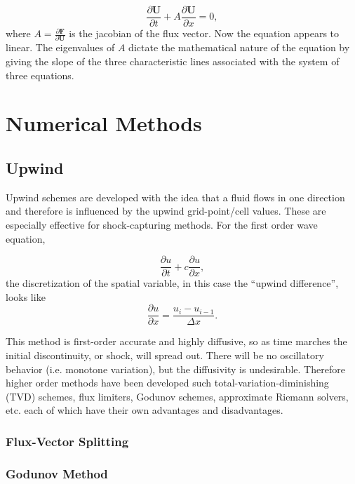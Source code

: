 \documentclass[]{article}
\begin{document}
    \begin{equation}
    	\frac{\partial \textbf{U}}{\partial t} + A\frac{\partial \textbf{U}}{\partial x} = 0,
    \end{equation}
	where $A = \frac{\partial \textbf{F}}{\partial \textbf{U}}$ is the jacobian of the flux vector. Now the equation appears to linear. The eigenvalues of $A$ dictate the mathematical nature of the equation by giving the slope of the three characteristic lines associated with the system of three equations. 

	
\section{Numerical Methods}

\subsection{Upwind}
	
	Upwind schemes are developed with the idea that a fluid flows in one direction and therefore is influenced by the upwind grid-point/cell values. These are especially effective for shock-capturing methods. For the first order wave equation,
	
	\begin{equation}
		\frac{\partial u}{\partial t} + c \frac{\partial u}{\partial x},
	\end{equation}
	the discretization of the spatial variable, in this case the ``upwind difference'', looks like
	\begin{equation}
		\frac{\partial u}{\partial x} = \frac{u_i - u_{i-1}}{\Delta x}.
	\end{equation}

	This method is first-order accurate and highly diffusive, so as time marches the initial discontinuity, or shock, will spread out. There will be no oscillatory behavior (i.e. monotone variation), but the diffusivity is undesirable. Therefore higher order methods have been developed such total-variation-diminishing (TVD) schemes, flux limiters, Godunov schemes, approximate Riemann solvers, etc. each of which have their own advantages and disadvantages.

\subsubsection{Flux-Vector Splitting}

\subsubsection{Godunov Method}
\end{document}
